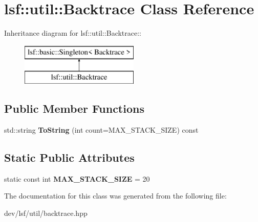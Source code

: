 \hypertarget{classlsf_1_1util_1_1Backtrace}{
\section{lsf::util::Backtrace Class Reference}
\label{classlsf_1_1util_1_1Backtrace}
}
Inheritance diagram for lsf::util::Backtrace::\begin{figure}[H]
\begin{center}
\leavevmode
\includegraphics[height=2cm]{classlsf_1_1util_1_1Backtrace}
\end{center}
\end{figure}
\subsection*{Public Member Functions}
\begin{DoxyCompactItemize}
\item 
\hypertarget{classlsf_1_1util_1_1Backtrace_a0fe02ff01ddaf0f936a0ebd8480ea888}{
std::string {\bfseries ToString} (int count=MAX\_\-STACK\_\-SIZE) const }
\label{classlsf_1_1util_1_1Backtrace_a0fe02ff01ddaf0f936a0ebd8480ea888}

\end{DoxyCompactItemize}
\subsection*{Static Public Attributes}
\begin{DoxyCompactItemize}
\item 
\hypertarget{classlsf_1_1util_1_1Backtrace_ae60906097bbfe2ae721173e8ceb2bc3d}{
static const int {\bfseries MAX\_\-STACK\_\-SIZE} = 20}
\label{classlsf_1_1util_1_1Backtrace_ae60906097bbfe2ae721173e8ceb2bc3d}

\end{DoxyCompactItemize}


The documentation for this class was generated from the following file:\begin{DoxyCompactItemize}
\item 
dev/lsf/util/backtrace.hpp\end{DoxyCompactItemize}
